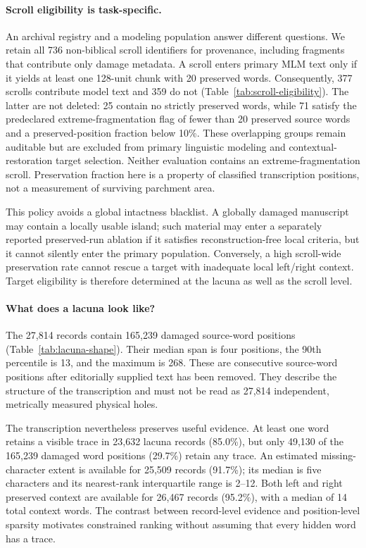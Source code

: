 \documentclass[10pt,twocolumn,a4paper]{article}
\begin{document}
\paragraph{Scroll eligibility is task-specific.}
An archival registry and a modeling population answer different questions. We retain all 736 non-biblical scroll identifiers for provenance, including fragments that contribute only damage metadata. A scroll enters primary MLM text only if it yields at least one 128-unit chunk with 20 preserved words. Consequently, 377 scrolls contribute model text and 359 do not (Table~\ref{tab:scroll-eligibility}). The latter are not deleted: 25 contain no strictly preserved words, while 71 satisfy the predeclared extreme-fragmentation flag of fewer than 20 preserved source words and a preserved-position fraction below 10\%. These overlapping groups remain auditable but are excluded from primary linguistic modeling and contextual-restoration target selection. Neither evaluation contains an extreme-fragmentation scroll. Preservation fraction here is a property of classified transcription positions, not a measurement of surviving parchment area.

\ScrollEligibilityTable

This policy avoids a global intactness blacklist. A globally damaged manuscript may contain a locally usable island; such material may enter a separately reported preserved-run ablation if it satisfies reconstruction-free local criteria, but it cannot silently enter the primary population. Conversely, a high scroll-wide preservation rate cannot rescue a target with inadequate local left/right context. Target eligibility is therefore determined at the lacuna as well as the scroll level.

\paragraph{What does a lacuna look like?}
The 27,814 records contain 165,239 damaged source-word positions (Table~\ref{tab:lacuna-shape}). Their median span is four positions, the 90th percentile is 13, and the maximum is 268. These are consecutive source-word positions after editorially supplied text has been removed. They describe the structure of the transcription and must not be read as 27,814 independent, metrically measured physical holes.

\LacunaShapeTable

The transcription nevertheless preserves useful evidence. At least one word retains a visible trace in 23,632 lacuna records (85.0\%), but only 49,130 of the 165,239 damaged word positions (29.7\%) retain any trace. An estimated missing-character extent is available for 25,509 records (91.7\%); its median is five characters and its nearest-rank interquartile range is 2--12. Both left and right preserved context are available for 26,467 records (95.2\%), with a median of 14 total context words. The contrast between record-level evidence and position-level sparsity motivates constrained ranking without assuming that every hidden word has a trace.
\end{document}
